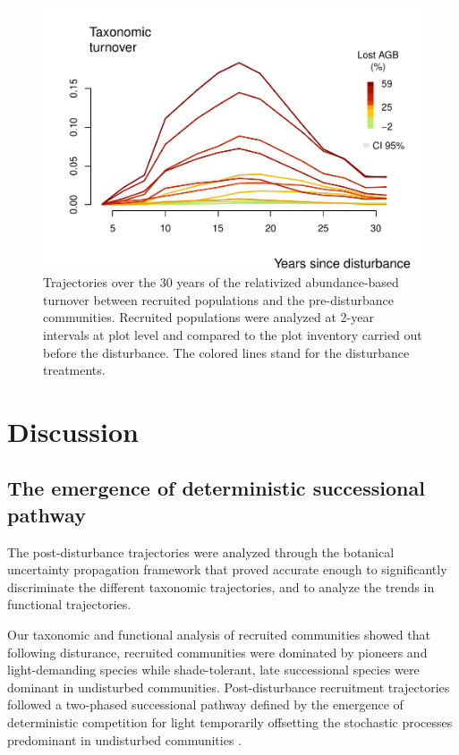 \documentclass[fleqn,10pt]{ArtEcoFoG} %
\begin{document}
\begin{figure}

{\centering \includegraphics[width=1\linewidth]{RecruitmentTrajectories_files/figure-latex/Turnover-1} 

}

\caption{ Trajectories over the 30 years of the relativized abundance-based turnover between recruited populations and the pre-disturbance communities. Recruited populations were analyzed at 2-year intervals at plot level and compared to the plot inventory carried out before the disturbance. The colored lines stand for the disturbance treatments.}\label{fig:Turnover}
\end{figure}

\hypertarget{discussion}{%
\section{Discussion}\label{discussion}}

\hypertarget{the-emergence-of-deterministic-successional-pathway}{%
\subsection{The emergence of deterministic successional pathway}\label{the-emergence-of-deterministic-successional-pathway}}

The post-disturbance trajectories were analyzed through the botanical uncertainty propagation framework that proved accurate enough to significantly discriminate the different taxonomic trajectories, and to analyze the trends in functional trajectories.

Our taxonomic and functional analysis of recruited communities showed that following disturance, recruited communities were dominated by pioneers and light-demanding species while shade-tolerant, late successional species were dominant in undisturbed communities.
Post-disturbance recruitment trajectories followed a two-phased successional pathway defined by the emergence of deterministic competition for light temporarily offsetting the stochastic processes predominant in undisturbed communities \citep{Clements1916, Denslow2000, Meiners2015}.
\end{document}
